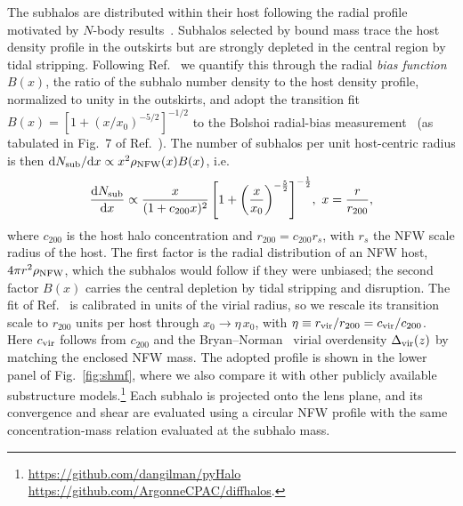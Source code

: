 \documentclass[aps,prd,10pt,nofootinbib,twocolumn,superscriptaddress,floatfix,notitlepage]{revtex4-1}
\newcommand{\td}{{\rm d}}
\newcommand{\be}{\begin{equation}}
\newcommand{\ee}{\end{equation}}
\newcommand{\B}[1]{{\color{blue} #1}}
\begin{document}
The subhalos are distributed within their host following the radial profile motivated by $N$-body results~\cite{Green:2021vtc, Klypin:2010qw}. Subhalos selected by bound mass trace the host density profile in the outskirts but are strongly depleted in the central region by tidal stripping. Following Ref.~\cite{Green:2021vtc} we quantify this through the radial \emph{bias function} $B(x)$, the ratio of the subhalo number density to the host density profile, normalized to unity in the outskirts, and adopt the transition fit $B(x) = [1+(x/x_0)^{-5/2}]^{-1/2}$ to the Bolshoi radial-bias measurement~\cite{Klypin:2010qw} (as tabulated in Fig.~7 of Ref.~\cite{Green:2021vtc}). The number of subhalos per unit host-centric radius is then $\td N_{\rm sub}/\td x \propto x^2 \rho_{\rm NFW}(x) B(x)$,\B{ i.e.}
\be \label{eq:radial}
    \frac{\td N_{\rm sub}}{\td x} \propto \frac{x}{(1+c_{200} x)^2} \left[ 1 + \left(\frac{x}{x_0}\right)^{-\frac52} \right]^{-\frac12} \!, \,\, x = \frac{r}{r_{200}} ,
\ee
where $c_{200}$ is the host halo concentration and $r_{200} = c_{200} r_s$, with $r_s$ the NFW scale radius of the host. The first factor is the radial distribution of an NFW host, $4\pi r^2 \rho_{\rm NFW}$, which the subhalos would follow if they were unbiased; the second factor $B(x)$ carries the central depletion by tidal stripping and disruption. The fit of Ref.~\cite{Green:2021vtc} is calibrated in units of the virial radius, so we rescale its transition scale to $r_{200}$ units per host through $x_0 \to \eta\, x_0$, with $\eta \equiv r_{\rm vir}/r_{200} = c_{\rm vir}/c_{200}$. Here $c_{\rm vir}$ follows from $c_{200}$ and the Bryan--Norman~\cite{Bryan:1997dn} virial overdensity $\Delta_{\rm vir}(z)$ by matching the enclosed NFW mass. The adopted profile is shown in the lower panel of Fig.~\ref{fig:shmf}, where we also compare it with other publicly available substructure models.\footnote{\url{https://github.com/dangilman/pyHalo} \\ \url{https://github.com/ArgonneCPAC/diffhalos}.} Each subhalo is projected onto the lens plane, and its convergence and shear are evaluated using a circular NFW profile with the same concentration-mass relation evaluated at the subhalo mass.
\end{document}
